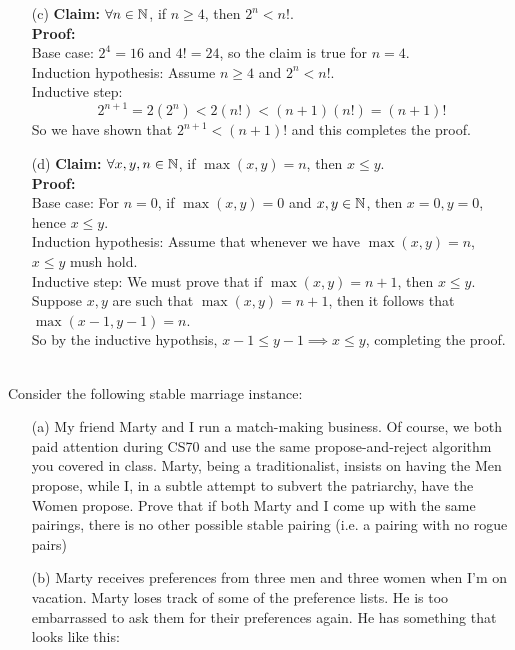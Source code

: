 \documentclass[11pt]{article}
\newif\ifsolutions
\begin{document}
\begin{qunlist}
\begin{itemize}
\item[(c)]\textbf{Claim:} $\forall n \in \mathbb{N}$, if $n \geq 4$, then $2^n < n!$. \\
\textbf{Proof:} \\
Base case: $2^4 = 16$ and $4! = 24$, so the claim is true for $n=4$. \\
Induction hypothesis: Assume $n \geq 4$ and $2^n < n!$. \\
Inductive step: \[ 2^{n+1} = 2(2^n) < 2(n!) < (n+1)(n!) = (n+1)!\]
So we have shown that $2^{n+1} < (n+1)!$ and this completes the proof.

\ifsolutions
\textbf{Solutions:} This proof is correct.
\fi


\item[(d)]\textbf{Claim:} $\forall x,y,n \in \mathbb{N}$, if $\max(x,y) = n$, then $x \leq y$. \\
\textbf{Proof:} \\
Base case: For $n=0$, if $\max(x,y) = 0$ and $x,y \in \mathbb{N}$, then $x=0, y=0$, hence $x \leq y$. \\
Induction hypothesis: Assume that whenever we have $\max(x,y) = n$, $x \leq y$ mush hold. \\
Inductive step: We must prove that if $\max(x,y) = n+1$, then $x \leq y$. \\
Suppose $x,y$ are such that $\max(x,y) = n+1$, then it follows that $\max(x-1,y-1) = n$. \\
So by the inductive hypothsis, $x-1 \leq y-1  \implies x \leq y$, completing the proof.

\ifsolutions
\textbf{Solutions:}
\fi


\end{itemize}




 \\ 
Consider the following stable marriage instance:

\begin{itemize}
\item[(a)] My friend Marty and I run a match-making business. Of course, we both paid attention during CS70 and use the same propose-and-reject algorithm you covered in class. Marty, being a traditionalist, insists on having the Men propose, while I, in a subtle attempt to subvert the patriarchy, have the Women propose. Prove that if both Marty and I come up with the same pairings, there is no other possible stable pairing (i.e. a pairing with no rogue pairs)

\item[(b)] Marty receives preferences from three men and three women when I'm on vacation. Marty loses track of some of the preference lists. He is too embarrassed to ask them for their preferences again. He has something that looks like this:


\end{itemize}
\end{qunlist}
\end{document}
